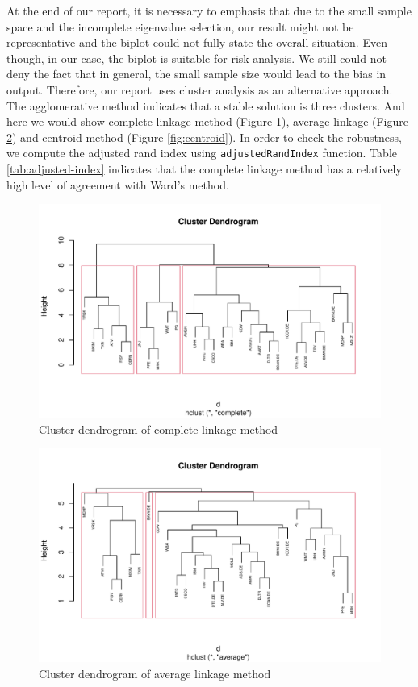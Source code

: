 \documentclass[11pt,a4paper,]{article}
\begin{document}
At the end of our report, it is necessary to emphasis that due to the small sample space and the incomplete eigenvalue selection, our result might not be representative and the biplot could not fully state the overall situation. Even though, in our case, the biplot is suitable for risk analysis. We still could not deny the fact that in general, the small sample size would lead to the bias in output. Therefore, our report uses cluster analysis as an alternative approach. The agglomerative method indicates that a stable solution is three clusters. And here we would show complete linkage method (Figure \ref{fig:complete}), average linkage (Figure \ref{fig:average}) and centroid method (Figure \ref{fig:centroid}). In order to check the robustness, we compute the adjusted rand index using \texttt{adjustedRandIndex} function. Table \ref{tab:adjusted-index} indicates that the complete linkage method has a relatively high level of agreement with Ward's method.

\begin{figure}
\centering
\includegraphics{ass2_files/figure-latex/complete-1.pdf}
\caption{\label{fig:complete}Cluster dendrogram of complete linkage method}
\end{figure}

\begin{figure}
\centering
\includegraphics{ass2_files/figure-latex/average-1.pdf}
\caption{\label{fig:average}Cluster dendrogram of average linkage method}
\end{figure}
\end{document}
